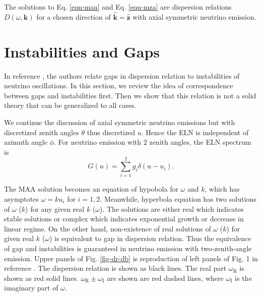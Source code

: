 \documentclass[%
preprint,
 amsmath,amssymb,
 aps,
 prd
]{revtex4-1}
\begin{document}
The solutions to Eq. \eqref{eqn-maa} and Eq. \eqref{eqn-mza} are dispersion relations $D(\omega,\mathbf k)$ for a chosen direction of $\hat{\mathbf k} = \hat{\mathbf z}$ with axial symmetric neutrino emission.









\section{\label{sec-instabilities-and-gaps}Instabilities and Gaps}

In reference , the authors relate gaps in dispersion relation to instabilities of neutrino oscillations. In this section, we review the idea of correspondence between gaps and instabilities first. Then we show that this relation is not a solid theory that can be generalized to all cases.

We continue the discussion of axial symmetric neutrino emissions but with discretized zenith angles $\theta$ thus discretized $u$. Hence the ELN is independent of azimuth angle $\phi$. For neutrino emission with $2$ zenith angles, the ELN spectrum is
\begin{equation}
G(u)= \sum_{i=1}^2 g_i \delta(u - u_i).
\end{equation}

The MAA solution becomes an equation of hypobola for $\omega$ and $k$, which has asymptotes $\omega = k u_i$ for $i=1,2$. Meanwhile, hyperbola equation has two solutions of $\omega$ ($k$) for any given real $k$ ($\omega$). The solutions are either real which indicates stable solutions or complex which indicates exponential growth or decrease in linear regime. On the other hand, non-existence of real solutions of $\omega$ ($k$) for given real $k$ ($\omega$) is equivalent to gap in dispersion relation. Thus the equivalence of gap and instabilities is guaranteed in neutrino emission with two-zenith-angle emission. Upper panels of Fig. \ref{fig-dr-db} is reproduction of left panels of Fig. 1 in reference . The dispersion relation is shown as black lines. The real part $\omega_{\mathrm R}$ is shown as red solid lines. $\omega_{\mathrm R} \pm \omega_{\mathrm I}$ are shown are red dashed lines, where $\omega_{\mathrm I}$ is the imaginary part of $\omega$. 
\end{document}

